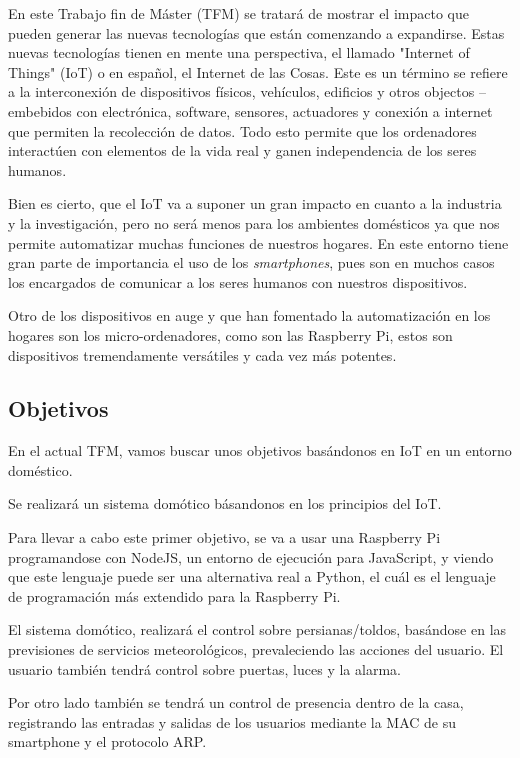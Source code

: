 \documentclass[10pt,journal,compsoc]{IEEEtran}
\begin{document}
\IEEEPARstart En este Trabajo fin de Máster (TFM) se tratará de mostrar el impacto 
que pueden generar las nuevas tecnologías que están comenzando a expandirse.
Estas nuevas tecnologías tienen en mente una perspectiva, el llamado
"Internet of Things" (IoT) o en español, el Internet de las Cosas. 
Este es un término se refiere a la interconexión de dispositivos físicos, vehículos, edificios 
y otros objectos --embebidos con electrónica, software, sensores, actuadores y conexión a 
internet que permiten la recolección de datos.
Todo esto permite que los ordenadores interactúen con elementos de la vida real y ganen 
independencia de los seres humanos.

Bien es cierto, que el IoT va a suponer un gran impacto en cuanto a la industria y la investigación,
pero no será menos para los ambientes domésticos ya que nos permite automatizar muchas funciones 
de nuestros hogares.
En este entorno tiene gran parte de importancia el uso de los \textit{smartphones}, pues son en 
muchos casos los encargados de comunicar a los seres humanos con nuestros dispositivos.

Otro de los dispositivos en auge y que han fomentado la automatización en los hogares son los 
micro-ordenadores, como son las Raspberry Pi, estos son dispositivos tremendamente versátiles 
y cada vez más potentes.

\subsection{Objetivos}
En el actual TFM, vamos buscar unos objetivos basándonos en IoT en un entorno doméstico.

Se realizará un sistema domótico básandonos en los principios del IoT.

Para llevar a cabo este primer objetivo, se va a usar una Raspberry Pi programandose con NodeJS, 
un entorno de ejecución para JavaScript, y viendo que este lenguaje puede ser una alternativa real a 
Python, el cuál es el lenguaje de programación más extendido para la Raspberry Pi.

El sistema domótico, realizará el control sobre persianas/toldos, basándose en las previsiones 
de servicios meteorológicos, prevaleciendo las acciones del usuario. El usuario también tendrá 
control sobre puertas, luces y la alarma.

Por otro lado también se tendrá un control de presencia dentro de la casa, registrando las 
entradas y salidas de los usuarios mediante la MAC de su smartphone y el protocolo ARP. 
\end{document}
